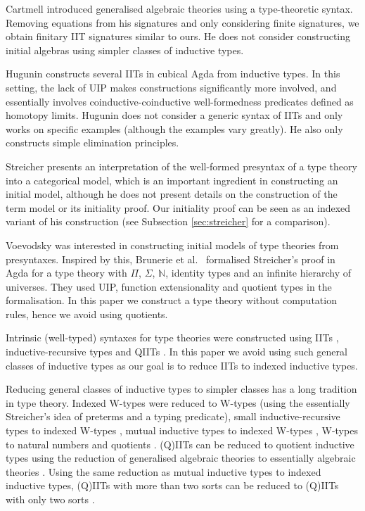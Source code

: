 \documentclass[a4paper,UKenglish,cleveref, autoref]{lipics-v2019}
\begin{document}
Cartmell \cite{gat} introduced generalised algebraic theories using a
type-theoretic syntax. Removing equations from his signatures and only
considering finite signatures, we obtain finitary IIT signatures similar to
ours. He does not consider constructing initial algebras using simpler classes
of inductive types.

Hugunin \cite{jasper} constructs several IITs in cubical Agda from
inductive types. In this setting, the lack of UIP makes constructions
significantly more involved, and essentially involves
coinductive-coinductive well-formedness predicates defined as homotopy
limits. Hugunin does not consider a generic syntax of IITs and only
works on specific examples (although the examples vary greatly). He
also only constructs simple elimination principles.

Streicher \cite{streichersemantics} presents an interpretation of the well-formed
presyntax of a type theory into a categorical model, which is an important
ingredient in constructing an initial model, although he does not present
details on the construction of the term model or its initiality proof. Our
initiality proof can be seen as an indexed variant of his construction
(see Subsection \ref{sec:streicher} for a comparison).

Voevodsky was interested in constructing initial models of type
theories from presyntaxes. Inspired by this, Brunerie et al.\ \cite{brunerie}
formalised Streicher's proof in Agda for a type theory with $\Pi$,
$\Sigma$, $\mathbb{N}$, identity types and an infinite hierarchy of
universes. They used UIP, function extensionality and quotient types in
the formalisation. In this paper we construct a type theory without
computation rules, hence we avoid using quotients.

Intrinsic (well-typed) syntaxes for type theories were constructed using
IITs \cite{chapman09eatitself}, inductive-recursive types
\cite{nisse,Altenkirch:2014:CO:2631172.2631176} and QIITs
\cite{ttintt}. In this paper we avoid using such general classes of
inductive types as our goal is to reduce IITs to indexed inductive
types.

Reducing general classes of inductive types to simpler classes has a
long tradition in type theory. Indexed W-types were reduced to W-types
\cite{indexedcont} (using the essentially Streicher's idea of preterms
and a typing predicate), small inductive-recursive types to indexed
W-types \cite{malatasta13smallir}, mutual inductive types to indexed
W-types \cite{mutual}, W-types to natural numbers and quotients
\cite{Ahrens2019}. (Q)IITs can be reduced to quotient inductive types
using the reduction of generalised algebraic theories to essentially
algebraic theories \cite{gat}. Using the same reduction as mutual
inductive types to indexed inductive types, (Q)IITs with more than two
sorts can be reduced to (Q)IITs with only two sorts \cite{szumiemail}.
\end{document}
